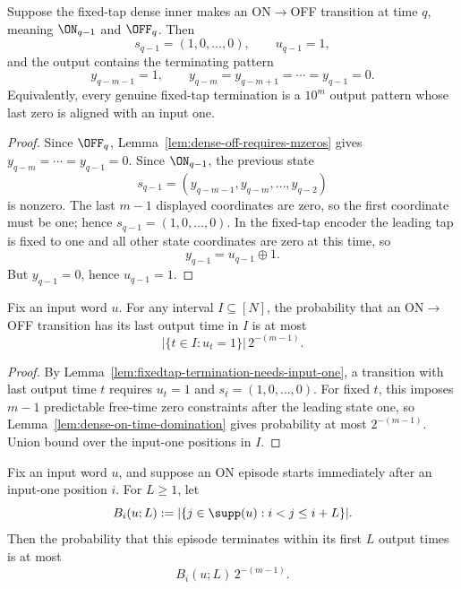 \begin{lemma}
\label{lem:fixedtap-termination-needs-input-one}
Suppose the fixed-tap dense inner makes an ON\(\to\)OFF transition at time \(q\), meaning \(\ON_{q-1}\) and
\(\OFF_q\). Then
\[
s_{q-1}=(1,0,\dots,0),
\qquad
u_{q-1}=1,
\]
and the output contains the terminating pattern
\[
y_{q-m-1}=1,
\qquad
y_{q-m}=y_{q-m+1}=\cdots=y_{q-1}=0.
\]
Equivalently, every genuine fixed-tap termination is a \(10^m\) output pattern whose last zero is aligned with an input
one.
\end{lemma}

\begin{proof}
Since \(\OFF_q\), Lemma~\ref{lem:dense-off-requires-mzeros} gives
\(y_{q-m}=\cdots=y_{q-1}=0\). Since \(\ON_{q-1}\), the previous state
\[
s_{q-1}=(y_{q-m-1},y_{q-m},\dots,y_{q-2})
\]
is nonzero. The last \(m-1\) displayed coordinates are zero, so the first coordinate must be one; hence
\(s_{q-1}=(1,0,\dots,0)\). In the fixed-tap encoder the leading tap is fixed to one and all other state coordinates are
zero at this time, so
\[
y_{q-1}=u_{q-1}\oplus 1.
\]
But \(y_{q-1}=0\), hence \(u_{q-1}=1\).
\end{proof}

\begin{lemma}
\label{lem:fixedtap-termination-candidates}
Fix an input word \(u\). For any interval \(I\subseteq[N]\), the probability that an ON\(\to\)OFF transition has its
last output time in \(I\) is at most
\[
|\{t\in I:u_t=1\}|\,2^{-(m-1)}.
\]
\end{lemma}

\begin{proof}
By Lemma~\ref{lem:fixedtap-termination-needs-input-one}, a transition with last output time \(t\) requires \(u_t=1\)
and \(s_t=(1,0,\dots,0)\). For fixed \(t\), this imposes \(m-1\) predictable free-time zero constraints after the
leading state one, so Lemma~\ref{lem:dense-on-time-domination} gives probability at most \(2^{-(m-1)}\). Union bound
over the input-one positions in \(I\).
\end{proof}

\begin{lemma}
\label{lem:fixedtap-one-episode-termination}
Fix an input word \(u\), and suppose an ON episode starts immediately after an input-one position \(i\). For
\(L\ge 1\), let
\[
B_i(u;L):=
|\{j\in \supp(u): i<j\le i+L\}|.
\]
Then the probability that this episode terminates within its first \(L\) output times is at most
\[
B_i(u;L)\,2^{-(m-1)}.
\]
\end{lemma}

